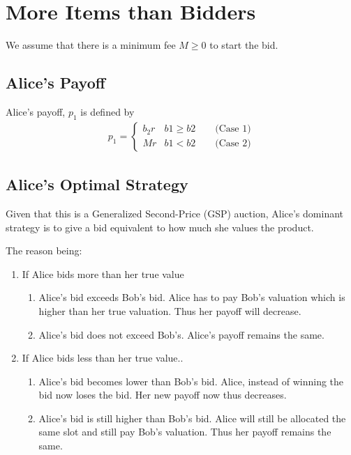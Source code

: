 \documentclass[]{article}
\begin{document}
\newpage
\section{More Items than Bidders}

We assume that there is a minimum fee $M \geq 0$ to start the bid. 

\subsection{Alice's Payoff}

Alice's payoff, $p_1$ is defined by
\begin{align*}
	p_1 = 
	\begin{cases} 
		b_2r & b1 \geq b2 \qquad  \text{(Case 1)} \\
		Mr & b1 < b2 \qquad \text{(Case 2)}
	\end{cases}
\end{align*}

\subsection{Alice's Optimal Strategy}

Given that this is a Generalized Second-Price (GSP) auction, Alice's dominant strategy is to give a bid equivalent to how much she values the product.

The reason being:
\begin{enumerate}
	\item If Alice bids more than her true value
	\begin{enumerate}[label=\alph*]
		\item Alice's bid exceeds Bob's bid. Alice has to pay Bob's valuation which is higher than her true valuation. Thus her payoff will decrease.
		\item Alice's bid does not exceed Bob's. Alice's payoff remains the same. 
	\end{enumerate}
	\item If Alice bids less than her true value..
	\begin{enumerate}[label=\alph*]
		\item Alice's bid becomes lower than Bob's bid. Alice, instead of winning the bid now loses the bid. Her new payoff now thus decreases.
		\item Alice's bid is still higher than Bob's bid. Alice will still be allocated the same slot and still pay Bob's valuation. Thus her payoff remains the same.
	\end{enumerate}
\end{enumerate}
\end{document}
